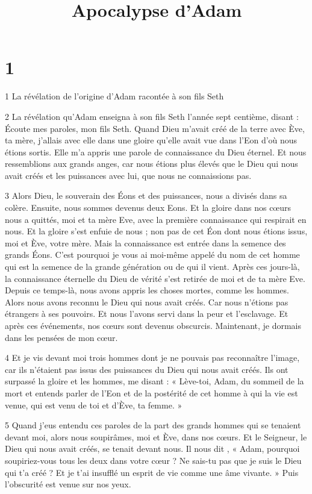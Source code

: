 

\title{Apocalypse d'Adam}

\chapter{1}

\par 1 La révélation de l'origine d'Adam racontée à son fils Seth

\par 2 La révélation qu'Adam enseigna à son fils Seth l'année sept centième, disant : Écoute mes paroles, mon fils Seth. Quand Dieu m'avait créé de la terre avec Ève, ta mère, j'allais avec elle dans une gloire qu'elle avait vue dans l'Eon d'où nous étions sortis. Elle m'a appris une parole de connaissance du Dieu éternel. Et nous ressemblions aux grands anges, car nous étions plus élevés que le Dieu qui nous avait créés et les puissances avec lui, que nous ne connaissions pas.

\par 3 Alors Dieu, le souverain des Éons et des puissances, nous a divisés dans sa colère. Ensuite, nous sommes devenus deux Eons. Et la gloire dans nos cœurs nous a quittés, moi et ta mère Eve, avec la première connaissance qui respirait en nous. Et la gloire s'est enfuie de nous ; non pas de cet Éon dont nous étions issus, moi et Ève, votre mère. Mais la connaissance est entrée dans la semence des grands Éons. C'est pourquoi je vous ai moi-même appelé du nom de cet homme qui est la semence de la grande génération ou de qui il vient. Après ces jours-là, la connaissance éternelle du Dieu de vérité s'est retirée de moi et de ta mère Eve. Depuis ce temps-là, nous avons appris les choses mortes, comme les hommes. Alors nous avons reconnu le Dieu qui nous avait créés. Car nous n'étions pas étrangers à ses pouvoirs. Et nous l'avons servi dans la peur et l'esclavage. Et après ces événements, nos cœurs sont devenus obscurcis. Maintenant, je dormais dans les pensées de mon cœur.

\par 4 Et je vis devant moi trois hommes dont je ne pouvais pas reconnaître l'image, car ils n'étaient pas issus des puissances du Dieu qui nous avait créés. Ils ont surpassé la gloire et les hommes, me disant : « Lève-toi, Adam, du sommeil de la mort et entends parler de l'Eon et de la postérité de cet homme à qui la vie est venue, qui est venu de toi et d'Ève, ta femme. »

\par 5 Quand j'eus entendu ces paroles de la part des grands hommes qui se tenaient devant moi, alors nous soupirâmes, moi et Ève, dans nos cœurs. Et le Seigneur, le Dieu qui nous avait créés, se tenait devant nous. Il nous dit , « Adam, pourquoi soupiriez-vous tous les deux dans votre cœur ? Ne sais-tu pas que je suis le Dieu qui t'a créé ? Et je t'ai insufflé un esprit de vie comme une âme vivante. » Puis l'obscurité est venue sur nos yeux.

